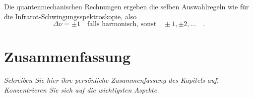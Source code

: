 Die quantenmechanischen Rechnungen ergeben die selben Auswahlregeln wie für die Infrarot-Schwingungsspektroskopie, also 
\begin{equation}
 \Delta \nu = \pm 1 \quad \text{falls harmonisch, sonst} \quad \pm 1, \pm 2, \dots   \quad .
\end{equation}

\newpage





\section{Zusammenfassung}

\textit{Schreiben Sie hier ihre persönliche Zusammenfassung des Kapitels auf. Konzentrieren Sie sich auf die wichtigsten Aspekte.}

\vspace*{10cm}


\printbibliography[segment=\therefsegment,heading=subbibliography]
